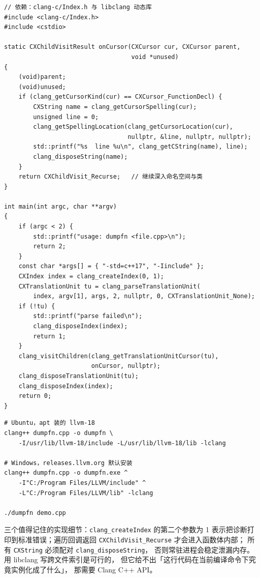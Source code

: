 \documentclass[12pt,a4paper,fontset=fandol]{ctexbook}
\begin{document}
\begin{lstlisting}[style=cppstyle,caption={libclang：遍历 cursor 打印所有函数声明},label={lst:ch01-libclang}]
// 依赖：clang-c/Index.h 与 libclang 动态库
#include <clang-c/Index.h>
#include <cstdio>

static CXChildVisitResult onCursor(CXCursor cur, CXCursor parent,
                                   void *unused)
{
    (void)parent;
    (void)unused;
    if (clang_getCursorKind(cur) == CXCursor_FunctionDecl) {
        CXString name = clang_getCursorSpelling(cur);
        unsigned line = 0;
        clang_getSpellingLocation(clang_getCursorLocation(cur),
                                  nullptr, &line, nullptr, nullptr);
        std::printf("%s  line %u\n", clang_getCString(name), line);
        clang_disposeString(name);
    }
    return CXChildVisit_Recurse;   // 继续深入命名空间与类
}

int main(int argc, char **argv)
{
    if (argc < 2) {
        std::printf("usage: dumpfn <file.cpp>\n");
        return 2;
    }
    const char *args[] = { "-std=c++17", "-Iinclude" };
    CXIndex index = clang_createIndex(0, 1);
    CXTranslationUnit tu = clang_parseTranslationUnit(
        index, argv[1], args, 2, nullptr, 0, CXTranslationUnit_None);
    if (!tu) {
        std::printf("parse failed\n");
        clang_disposeIndex(index);
        return 1;
    }
    clang_visitChildren(clang_getTranslationUnitCursor(tu),
                        onCursor, nullptr);
    clang_disposeTranslationUnit(tu);
    clang_disposeIndex(index);
    return 0;
}
\end{lstlisting}

\begin{lstlisting}[style=shellstyle,caption={编译并运行 libclang 程序},label={lst:ch01-libclang-build}]
# Ubuntu，apt 装的 llvm-18
clang++ dumpfn.cpp -o dumpfn \
    -I/usr/lib/llvm-18/include -L/usr/lib/llvm-18/lib -lclang

# Windows，releases.llvm.org 默认安装
clang++ dumpfn.cpp -o dumpfn.exe ^
    -I"C:/Program Files/LLVM/include" ^
    -L"C:/Program Files/LLVM/lib" -lclang

./dumpfn demo.cpp
\end{lstlisting}

三个值得记住的实现细节：\texttt{clang\_createIndex} 的第二个参数为 1
表示把诊断打印到标准错误；遍历回调返回
\texttt{CXChildVisit\_\allowbreak Recurse} 才会进入函数体内部；
所有 \texttt{CXString} 必须配对 \texttt{clang\_disposeString}，
否则常驻进程会稳定泄漏内存。用 libclang 写跨文件索引是可行的，
但它给不出「这行代码在当前编译命令下究竟实例化成了什么」，
那需要 Clang C++ API。
\end{document}
